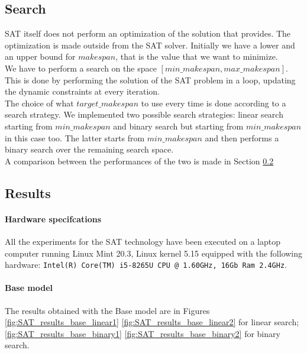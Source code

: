 
\subsection{Search}\label{subsec:SAT_search}
  SAT itself does not perform an optimization of the solution that provides.
  The optimization is made outside from the SAT solver. Initially we have a lower and an upper bound
  for \(makespan\), that is the value that we want to minimize.\\

  We have to perform a search on the space \([min\_makespan, max\_makespan]\). This is done by performing
  the solution of the SAT problem in a loop, updating the dynamic constraints at every iteration.\\

  The choice of what \(target\_makespan\) to use every time is done according to a search strategy.
  We implemented two possible search strategies: linear search starting from \(min\_makespan\) and
  binary search but starting from \(min\_makespan\) in this case too.
  The latter starts from \(min\_makespan\) and then performs a binary search over the remaining
  search space.\\

  A comparison between the performances of the two is made in Section \ref{subsec:SAT_results}


\subsection{Results}\label{subsec:SAT_results}

  \paragraph{Hardware specifcations}
    All the experiments for the SAT technology have been executed on a laptop computer running Linux Mint 20.3, Linux kernel 5.15
    equipped with the following hardware:
    \texttt{Intel(R) Core(TM) i5-8265U CPU @ 1.60GHz, 16Gb Ram 2.4GHz}.\\

  \paragraph{Base model}
    The results obtained with the Base model are in Figures \ref{fig:SAT_results_base_linear1} \ref{fig:SAT_results_base_linear2}
    for linear search; \ref{fig:SAT_results_base_binary1} \ref{fig:SAT_results_base_binary2} for binary search.

